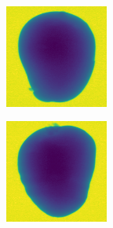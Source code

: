 \documentclass[11pt]{article}
\begin{document}
\begin{figure}[!h]
\begin{subfigure}[b]{0.22\textwidth}
         \caption{}
         \label{fig:perfect_31}
     \end{subfigure}
          \\
    \begin{subfigure}[b]{0.22\textwidth}
         \centering
         \includegraphics[width=\textwidth]{figurer/potato_dataset/perfect/perfect_32.jpg}
         \caption{}
         \label{fig:perfect_32}
     \end{subfigure}
     \hfill
     \begin{subfigure}[b]{0.22\textwidth}
         \centering
         \includegraphics[width=\textwidth]{figurer/potato_dataset/perfect/perfect_33.jpg}

\end{subfigure}
\end{figure}
\end{document}
